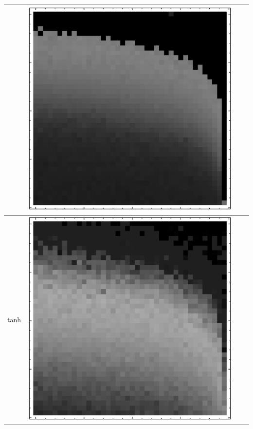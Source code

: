 \documentclass[10pt]{article}
\begin{document}
\begin{tabular}{|c|c|c|c|}
        & \includegraphics[scale=0.25]{plots/simple/LF-20S10S-20T10-CIFAR-3.eps} \\ \hline
tanh 
        & \includegraphics[scale=0.25]{plots/simple/LF-20T10T-20T10-CIFAR-1.eps}

\end{tabular}
\end{document}
